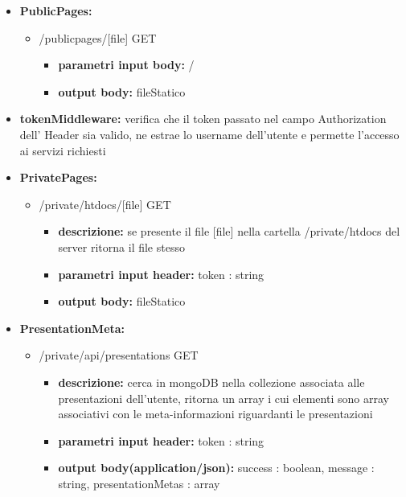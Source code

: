 {{\begin{itemize}
		\item \textbf{PublicPages:}
			\begin{itemize}
			\item  /publicpages/[file] GET
				\begin{itemize} 
				\item \textbf{parametri input body:} /
				\item \textbf{output body:} fileStatico
				\end{itemize}
			\end{itemize}
			
		\item \textbf{tokenMiddleware:} verifica che il token passato nel campo Authorization dell' Header sia valido, ne estrae lo username dell'utente e permette l'accesso ai servizi richiesti
		\item \textbf{PrivatePages:}
			\begin{itemize}
			\item  /private/htdocs/[file] GET
				\begin{itemize} 
				\item \textbf{descrizione:} se presente il file [file] nella cartella /private/htdocs del server ritorna il file stesso
				\item \textbf{parametri input header:} token : string
				\item \textbf{output body:} fileStatico
				\end{itemize}
			\end{itemize}
			
		\item \textbf{PresentationMeta:}
			\begin{itemize}
			\item  /private/api/presentations GET
				\begin{itemize} 
				\item \textbf{descrizione:} cerca in mongoDB nella collezione associata alle presentazioni dell'utente, ritorna un array i cui elementi sono array associativi con le meta-informazioni riguardanti le presentazioni
				\item \textbf{parametri input header:} token : string
				\item \textbf{output body(application/json):}  success : boolean, message : string, presentationMetas : array
				\end{itemize}
			\end{itemize}
			

\end{itemize}}}
